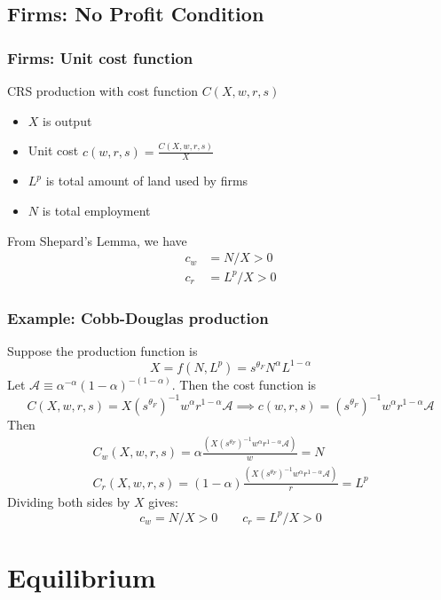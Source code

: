 \documentclass[11pt,notes=hide,aspectratio=169]{beamer}
\begin{document}
\subsection{Firms: No Profit Condition}
\begin{frame}
\frametitle{Firms: Unit cost function}
CRS production with cost function $C(X, w,r,s)$ 
\begin{itemize}
\item  $X$ is output
\item Unit cost $c(w, r, s)=\frac{C(X,w,r,s)}{X}$
\item $L^p$ is total amount of land used by firms
\item $N$ is total employment \medskip
\end{itemize}
From Shepard's Lemma, we have
\begin{align*}
c_w &= N/X >0 \\
c_r &= L^p/X >0
\end{align*}
\end{frame}
\begin{frame}
\frametitle{Example: Cobb-Douglas production}
Suppose the production function is
$$X=f(N,L^p)= s^{\theta_F} N^\alpha L^{1-\alpha}$$
Let $\mathcal{A} \equiv \alpha^{-\alpha} (1-\alpha)^{-(1-\alpha)}$.
Then the cost function is
\begin{equation*}
C(X,w,r,s) 
= X (s^{\theta_F})^{-1}w^\alpha r^{1-\alpha} \mathcal{A}
\implies
c(w,r,s)
=(s^{\theta_F})^{-1}w^\alpha r^{1-\alpha} \mathcal{A}
\end{equation*}
Then 
\begin{align*}
C_w(X,w,r,s) = \alpha \frac{\left(X (s^{\theta_F})^{-1}w^\alpha r^{1-\alpha} \mathcal{A} \right)}{w} = N \\
C_r(X,w,r,s) = (1-\alpha) \frac{\left(X (s^{\theta_F})^{-1}w^\alpha r^{1-\alpha} \mathcal{A} \right)}{r} = L^p
\end{align*}
Dividing both sides by $X$ gives:
\begin{equation*}
c_w = N/X >0
\qquad
c_r = L^p/X >0
\end{equation*}
\end{frame}
\section{Equilibrium}
\end{document}
